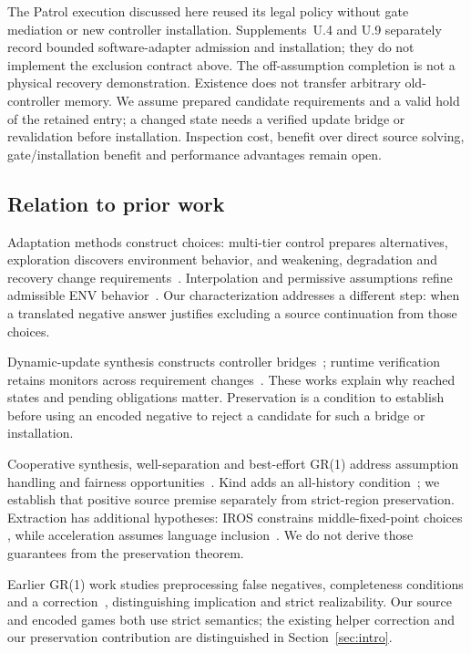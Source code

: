 The Patrol execution discussed here reused its legal policy without gate
mediation or new controller installation. Supplements~U.4 and U.9 separately
record bounded software-adapter admission and installation; they do not
implement the exclusion contract above. The off-assumption
completion is not a physical recovery demonstration. Existence does not
transfer arbitrary old-controller memory. We assume prepared candidate
requirements and a valid hold of the retained entry; a changed state needs
a verified update bridge or revalidation before installation. Inspection
cost, benefit over direct source solving, gate/installation benefit and
performance advantages remain open.

\subsection{Relation to prior work}\label{sec:related}
Adaptation methods construct choices: multi-tier control prepares alternatives,
exploration discovers environment behavior, and weakening, degradation and
recovery change requirements~\cite{dippolito2014multitier,keegan2022discovery,weakening2023,graceful2024}.
Interpolation and permissive assumptions refine admissible ENV
behavior~\cite{cavezza2017interpolation,anand2023apa}.
Our characterization addresses a different step: when a translated negative
answer justifies excluding a source continuation from those choices.

Dynamic-update synthesis constructs controller
bridges~\cite{nahabedian2020dynamic,dupdate}; runtime verification retains
monitors across requirement changes~\cite{runtimeverification2023}.
These works explain why reached states and pending obligations matter.
Preservation is a condition to establish before using an encoded negative
to reject a candidate for such a bridge or installation.

Cooperative synthesis, well-separation and best-effort GR(1) address
assumption handling and fairness opportunities~\cite{cooperative,friendly,wellsep,besteffort}.
Kind adds an all-history condition~\cite{kind}; we establish that positive
source premise separately from strict-region preservation. Extraction has
additional hypotheses: IROS constrains middle-fixed-point choices
\cite[author appendix, p.~9]{iros}, while acceleration assumes language
inclusion~\cite[Secs.~2.3,~4.1]{accelerating}. We do not derive those guarantees
from the preservation theorem.

Earlier GR(1) work studies preprocessing false negatives, completeness
conditions and a correction~\cite{klein2011revisiting}, distinguishing
implication and strict realizability. Our source and encoded games both use
strict semantics; the existing helper correction and our preservation
contribution are distinguished in Section~\ref{sec:intro}.
